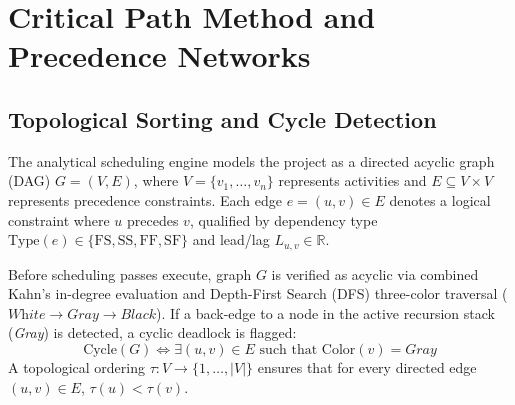 \vspace{6mm}

\section{Critical Path Method and Precedence Networks}
\subsection{Topological Sorting and Cycle Detection}
The analytical scheduling engine models the project as a directed acyclic graph (DAG) $G = (V, E)$, where $V = \{v_1, \dots, v_n\}$ represents activities and $E \subseteq V \times V$ represents precedence constraints. Each edge $e = (u, v) \in E$ denotes a logical constraint where $u$ precedes $v$, qualified by dependency type $\text{Type}(e) \in \{\text{FS}, \text{SS}, \text{FF}, \text{SF}\}$ and lead/lag $L_{u,v} \in \mathbb{R}$.

\vspace{2mm}

Before scheduling passes execute, graph $G$ is verified as acyclic via combined Kahn's in-degree evaluation and Depth-First Search (DFS) three-color traversal ($\textit{White} \to \textit{Gray} \to \textit{Black}$). If a back-edge to a node in the active recursion stack (\textit{Gray}) is detected, a cyclic deadlock is flagged:
$$
    \text{Cycle}(G) \iff \exists (u, v) \in E \text{ such that } \text{Color}(v) = \textit{Gray}
$$
A topological ordering $\tau: V \to \{1, \dots, |V|\}$ ensures that for every directed edge $(u, v) \in E$, $\tau(u) < \tau(v)$.

\newpage

